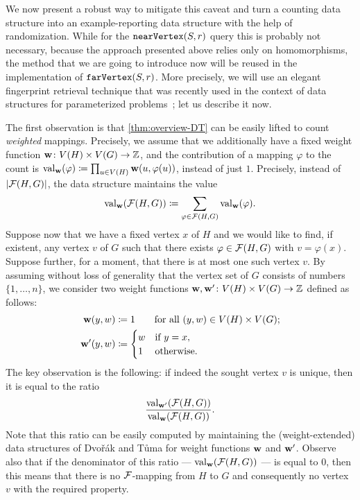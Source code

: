We now present a robust way to mitigate this caveat and turn a counting data structure into an example-reporting data structure with the help of randomization. While for the $\mathtt{nearVertex}(S,r)$ query this is probably not necessary, because the approach presented above relies only on homomorphisms, the method that we are going to introduce now will be reused in the implementation of $\mathtt{farVertex}(S,r)$. More precisely, we will use an elegant fingerprint retrieval technique that was recently used in the context of data structures for parameterized problems~\cite{Majewski24,Nadara22}; let us describe it now.

The first observation is that \cref{thm:overview-DT} can be easily lifted to count \emph{weighted} mappings. Precisely, we assume that we additionally have a fixed weight function $\mathbf{w}\colon V(H)\times V(G)\to \mathbb{Z}$, and the contribution of a mapping $\varphi$ to the count is $\mathrm{val}_{\mathbf{w}}(\varphi)\coloneqq \prod_{u\in V(H)} \mathbf{w}(u,\varphi(u))$, instead of just $1$. Precisely, instead of $|\mathcal{F}(H,G)|$, the data structure maintains the value
\[\mathrm{val}_{\mathbf{w}}(\mathcal{F}(H,G))\coloneqq \sum_{\varphi\in \mathcal{F}(H,G)} \mathrm{val}_{\mathbf{w}}(\varphi).\]
Suppose now that we have a fixed vertex $x$ of $H$ and we would like to find, if existent, any vertex $v$ of $G$ such that there exists $\varphi\in \mathcal{F}(H,G)$ with $v=\varphi(x)$. Suppose further, for a moment, that there is at most one such vertex $v$. By assuming without loss of generality that the vertex set of $G$ consists of numbers $\{1,\ldots,n\}$, we consider two weight functions $\mathbf{w},\mathbf{w}'\colon V(H)\times V(G)\to \mathbb{Z}$ defined as follows:
\begin{align*}
	\mathbf{w}(y,w) &\coloneqq 1\qquad \textrm{for all }(y,w)\in V(H)\times V(G);\\
	\mathbf{w}'(y,w) &\coloneqq \begin{cases}w & \textrm{if }y=x,\\ 1 & \textrm{otherwise.}\end{cases}
\end{align*}
The key observation is the following: if indeed the sought vertex $v$ is unique, then it is equal to the ratio
\[
\frac{\mathrm{val}_{\mathbf{w}'}(\mathcal{F}(H,G))}{\mathrm{val}_{\mathbf{w}}(\mathcal{F}(H,G))}.
\]
Note that this ratio can be easily computed by maintaining the (weight-extended) data structures of Dvo\v{r}\'ak and T\r{u}ma for weight functions $\mathbf{w}$ and $\mathbf{w}'$. Observe also that if the denominator of this ratio --- $\mathrm{val}_{\mathbf{w}}(\mathcal{F}(H,G))$ --- is equal to $0$, then this means that there is no $\mathcal{F}$-mapping from $H$ to $G$ and consequently no vertex $v$ with the required property.

